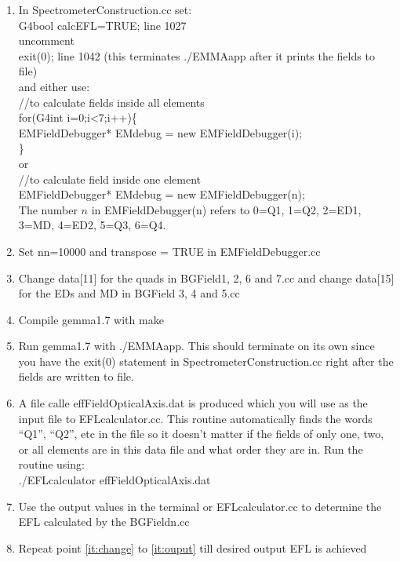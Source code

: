 \documentclass[letter,11pt]{article}
\newcommand{\filefont}[1]{{\scriptsize\ttfamily\selectfont #1}\xspace}
\begin{document}
\begin{enumerate}
\item In SpectrometerConstruction.cc set:\\
\filefont{G4bool calcEFL=TRUE;} line 1027\\
uncomment\\
\filefont{exit(0);} line 1042 (this terminates ./EMMAapp after it prints the fields to file)\\
and either use:\\
\filefont{      //to calculate fields inside all elements\\
      for(G4int i=0;i<7;i++)\{\\
        EMFieldDebugger* EMdebug = new EMFieldDebugger(i);\\
      \}
      }\\
or\\
\filefont{        //to calculate field inside one element\\
      EMFieldDebugger* EMdebug = new EMFieldDebugger(n);}\\
The number $n$ in \filefont{EMFieldDebugger(n)} refers to 0=Q1, 1=Q2, 2=ED1, 3=MD, 4=ED2, 5=Q3, 6=Q4.
\item Set \filefont{nn=10000} and \filefont{transpose = TRUE} in EMFieldDebugger.cc
\item\label{it:change} Change \filefont{data[11]} for the quads in BGField1, 2, 6 and 7.cc and change \filefont{data[15]} for the EDs and MD in BGField 3, 4 and 5.cc
\item Compile gemma1.7 with \filefont{make}
\item Run gemma1.7 with \filefont{./EMMAapp}. This should terminate on its own since you have the \filefont{exit(0)} statement in SpectrometerConstruction.cc right after the fields are written to file.
\item A file calle effFieldOpticalAxis.dat is produced which you will use as the input file to EFLcalculator.cc. This routine automatically finds the words ``Q1'', ``Q2'', etc in the file so it doesn't matter if the fields of only one, two, or all elements are in this data file and what order they are in. Run the routine using:\\
\filefont{./EFLcalculator effFieldOpticalAxis.dat}
\item\label{it:ouput} Use the output values in the terminal or EFLcalculator.cc to determine the EFL calculated by the BGFieldn.cc
\item Repeat point \ref{it:change} to \ref{it:ouput} till desired output EFL is achieved
\end{enumerate}
\end{document}
